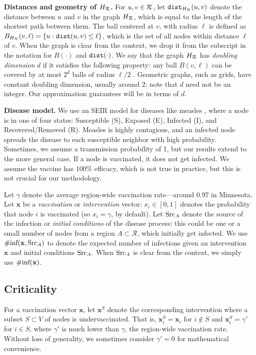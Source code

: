 \noindent
\textbf{Distances and geometry of $H_{\mathcal{R}}$.}
For $u, v\in \mathcal{R}$, let $\texttt{dist}_{H_{\mathcal{R}}}(u, v)$ denote the distance between $u$ and $v$ in the graph $H_{\mathcal{R}}$, which is equal to the length of the shortest path between them.
The ball centered at $v$, with radius $\ell$ is defined as $B_{H_{\mathcal{R}}}(v, \ell)=\{u: \texttt{dist}(u, v)\leq\ell\}$, which is the set of all nodes within distance $\ell$ of $v$. When the graph is clear from the context, we drop it from the subscript in the notation for $B(\cdot)$ and $\texttt{dist}(\cdot)$.
We say that the graph $H_{\mathcal{R}}$ has \emph{doubling dimension} $d$ if it satisfies the following property: any ball $B(v, \ell)$ can be covered by at most $2^d$ balls of radius $\ell/2$ \cite{gupta:focs03}. Geometric graphs, such as grids, have constant doubling dimension, usually around $2$; note that $d$ need not be an integer. Our approximation guarantees will be in terms of $d$.

\noindent
\textbf{Disease model.} We use an SEIR model for diseases like measles \cite{anderson+m:book}, 
where a node is in one of four states:
Susceptible (S), Exposed (E), Infected (I), and Recovered/Removed (R). Measles is highly contagious, and an infected node spreads the
disease to each susceptible neighbor with high probability. 
Sometimes, we assume a transmission probability of 1, but our results
extend to the more general case. If a node is vaccinated,
it does not get infected. We assume the vaccine has 100\% efficacy, which is
not true in practice, but this is not crucial for our methodology.

Let $\gamma$ denote the average region-wide vaccination rate---around $0.97$
in Minnesota. Let $\mathbf{x}$ be a \emph{vaccination} or \emph{intervention} vector: 
$x_i\in[0,1]$ denotes the probability that node $i$ is vaccinated (so $x_i=\gamma$,
by default).
Let $\text{Src}_A$ denote the source of the infection or \emph{initial conditions} of the disease process: this could be one or a small number of nodes from a region $A\subset \mathcal{R}$, which initially get infected. We use $\#\text{inf}(\mathbf{x}, \text{Src}_A)$ to denote the expected number of infections
given an intervention $\mathbf{x}$ and initial conditions $\text{Src}_A$.
When $\text{Src}_A$ is clear from the context, we simply use $\#\text{inf}(\mathbf{x})$.
  
\subsection{Criticality}
For a vaccination vector $\mathbf{x}$,
let $\mathbf{x}^S$ denote the corresponding intervention where a subset $S\subset V$ of
nodes is undervaccinated. That is,
$\mathbf{x}^S_i = \mathbf{x}_i$ for $i\not\in S$ and $\mathbf{x}^S_i=\gamma'$ for $i\in S$,
where $\gamma'$ is much lower than $\gamma$, the region-wide vaccination rate.
Without loss of generality, we sometimes consider $\gamma'=0$ for mathematical convenience.

